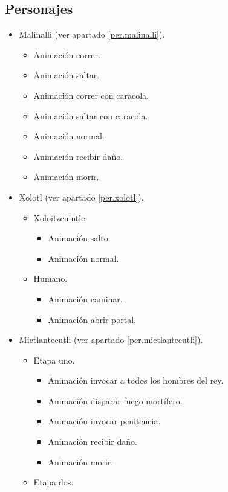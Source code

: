 	\subsection{Personajes} 
	\begin{itemize}
		\item Malinalli (ver apartado \ref{per.malinalli}).
		\begin{itemize}
			\item Animación correr.
			\item Animación saltar.
			\item Animación correr con caracola.
			\item Animación saltar con caracola.
			\item Animación normal.
			\item Animación recibir daño.
			\item Animación morir.
		\end{itemize}
		\item Xolotl (ver apartado \ref{per.xolotl}).
		\begin{itemize}
			\item Xoloitzcuintle. 
				\begin{itemize}
					\item Animación salto.
					\item Animación normal.
				\end{itemize}
			\item Humano.
				\begin{itemize}
					\item Animación caminar.
					\item Animación abrir portal.  
				\end{itemize}
		\end{itemize}
		\item Mictlantecutli (ver apartado \ref{per.mictlantecutli}).
		\begin{itemize}
			\item Etapa uno.
				\begin{itemize}
					\item Animación invocar a todos los hombres del rey.
					\item Animación disparar fuego mortífero.
					\item Animación invocar penitencia.
					\item Animación recibir daño.
					\item Animación morir.
				\end{itemize}
			\item Etapa dos.

\end{itemize}
\end{itemize}
